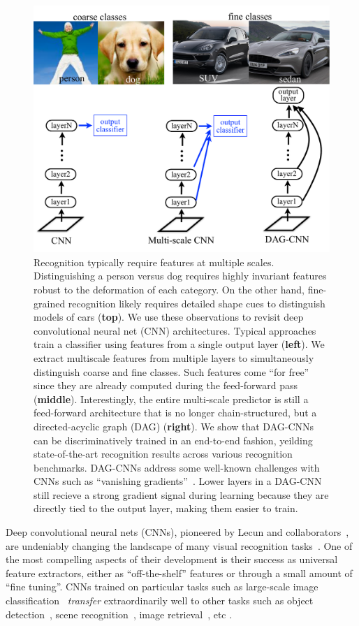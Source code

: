 \documentclass[10pt,twocolumn,letterpaper]{article}
\begin{document}
\begin{figure}[t!]
\centering
\includegraphics[width=\columnwidth]{fig/deva_splash}
\caption{Recognition typically require features at multiple scales. Distinguishing a person versus dog requires highly invariant features robust to the deformation of each category. On the other hand, fine-grained recognition likely requires detailed shape cues to distinguish models of cars ({\bf top}). We use these observations to revisit deep convolutional neural net (CNN) architectures. Typical approaches train a classifier using features from a single output layer ({\bf left}). We extract multiscale features from multiple layers to simultaneously distinguish coarse and fine classes. Such features come ``for free'' since they are already computed during the feed-forward pass ({\bf middle}). Interestingly, the entire multi-scale predictor is still a feed-forward architecture that is no longer chain-structured, but a directed-acyclic graph (DAG) ({\bf right}). We show that DAG-CNNs can be discriminatively trained in an end-to-end fashion, yeilding state-of-the-art recognition results across various recognition benchmarks.  DAG-CNNs address some well-known challenges with CNNs such as ``vanishing gradients''~\cite{bengio1994learning}. Lower layers in a DAG-CNN still recieve a strong gradient signal during learning because they are directly tied to the output layer, making them easier to train.
\label{fig:splash}}
\end{figure}

Deep convolutional neural nets (CNNs), pioneered by Lecun and collaborators~\cite{lecun1998gradient}, are undeniably changing the landscape of many visual recognition tasks~\cite{AlexNet, overfeat, veryDeep, GoogLeNet, nin}. One of the most compelling aspects of their development is their success as universal feature extractors, either as ``off-the-shelf'' features or through a small amount of ``fine tuning''. CNNs trained on particular tasks such as large-scale image classification~\cite{ImageNet} {\em transfer} extraordinarily well to other tasks such as object detection~\cite{rcnn}, scene recognition~\cite{zhoulearning}, image retrieval~\cite{Gong14}, etc \cite{cnn_baseline}.
\end{document}
